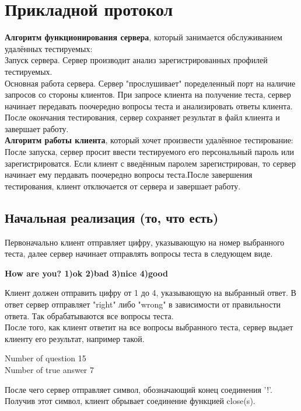 \documentclass[12pt,a4paper]{report}
\begin{document}
\section{Прикладной протокол}
\textbf{Алгоритм функционирования сервера}, который занимается обслуживанием удалённых тестируемых:\\
Запуск сервера. Сервер производит анализ зарегистрированных профилей тестируемых. \\
Основная работа сервера. Сервер "прослушивает" поределенный порт на наличие запросов со стороны клиентов. При запросе клиента на получение теста, сервер начинает передавать поочередно вопросы теста и анализировать ответы клиента. После окончания тестирования, сервер сохраняет результат в файл клиента и завершает работу. \\
\textbf{Алгоритм работы клиента}, который хочет произвести удалённое тестирование:\\
После запуска, сервер просит ввести тестируемого его персональный пароль или зарегистрироватся. Если клиент с введённым паролем зарегистрирован, то сервер начинает ему пердавать поочередно вопросы теста.После завершения тестирования, клиент отключается от сервера и завершает работу.
\subsection{Начальная реализация (то, что есть)}
Первоначально клиент отправляет цифру, указывающую на номер выбранного теста, далее сервер начинает  отправлять вопросы теста в следующем виде.
\begin{center}
\textbf{How are you? 1)ok 2)bad 3)nice 4)good}
\end{center}
Клиент должен отправить цифру от 1 до 4, указывающую на выбранный ответ. В ответ сервер отправляет "right" либо "wrong" в зависимости от правильности ответа. Так обрабатываются все вопросы теста.\\
После того, как клиент ответит на все вопросы выбранного теста, сервер выдает клиенту его результат, например такой.\begin{center}
Number of question 15\\
Number of true answer 7
\end{center}
После чего сервер отправляет символ, обозначающий конец соединения '!'. Получив этот символ, клиент обрывает соединение функцией close(s). 
\end{document}
